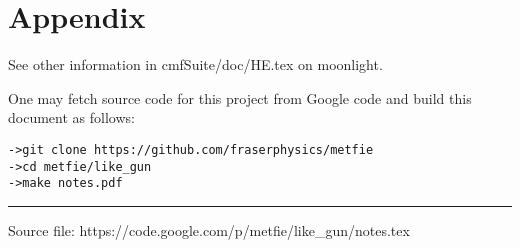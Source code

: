 \documentclass[11pt]{article}
\begin{document}
\section*{Appendix}
\label{sec:appendix}

See other information in cmfSuite/doc/HE.tex on moonlight.

One may fetch source code for this project from Google code and build
this document as follows:
\begin{verbatim}
->git clone https://github.com/fraserphysics/metfie
->cd metfie/like_gun
->make notes.pdf
\end{verbatim}

%
\vfill \hrule

Source file: https://code.google.com/p/metfie/like\_gun/notes.tex
\end{document}
